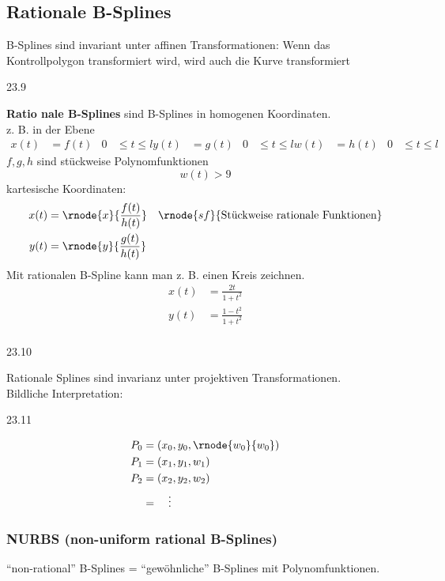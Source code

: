 \subsection{Rationale B-Splines}
\Satz B-Splines sind invariant unter affinen Transformationen: Wenn das Kontrollpolygon transformiert wird, wird auch
	die Kurve transformiert
\begin{center}
 23.9
\end{center}
\Defi \textbf{Ratio nale B-Splines} sind B-Splines in homogenen Koordinaten.\\[1em]
z. B. in der Ebene
\begin{align*}
 x(t) &= f(t)	& 0 &\le t \le l
 y(t) &= g(t)	& 0 &\le t \le l
 w(t) &= h(t)	& 0 &\le t \le l
\end{align*}
$f, g, h$ sind stückweise Polynomfunktionen
\[w(t)> 9\]
kartesische Koordinaten:
\begin{align*}
 x(t) &= \rnode{x}{\frac{f(t)}{h(t)}} & \rnode{sf}{\text{Stückweise rationale Funktionen}}\\
 y(t) &= \rnode{y}{\frac{g(t)}{h(t)}}
\end{align*}
Mit rationalen B-Spline kann man z. B. einen Kreis zeichnen.
\begin{align*}
 x(t) &= \frac{2t}{1+t^2}\\
 y(t) &= \frac{1-t^2}{1+t^2}\\
\end{align*}
\begin{center}
 23.10
\end{center}
\Satz Rationale Splines sind invarianz unter projektiven Transformationen.\\[1em]
Bildliche Interpretation:
\begin{center}
 23.11
\end{center}
\hspace{8cm}
\begin{align*}
 P_0 &= \left(x_0, y_0, \rnode{w_0}{w_0}\right)\\
 P_1 &= \left(x_1, y_1, w_1\right)\\
 P_2 &= \left(x_2, y_2, w_2\right)\\
	&= \quad \vdots
\end{align*}

\subsubsection[NURBS]{NURBS (non-uniform rational B-Splines)}
"`non-rational"' B-Splines = "`gewöhnliche"' B-Splines mit Polynomfunktionen.